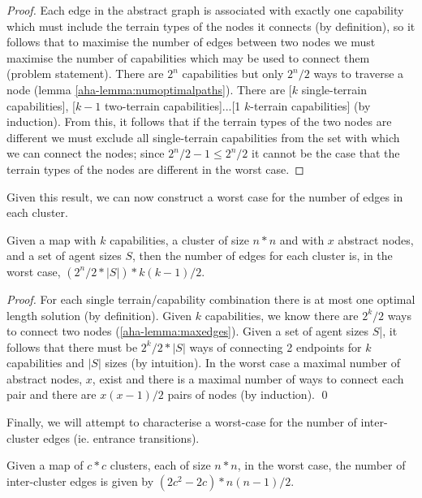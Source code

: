 \begin{proof}
Each edge in the abstract graph is associated with exactly one capability which must include the terrain types of the nodes it connects (by definition), so it follows that to maximise the number of edges between two nodes we must maximise the number of capabilities which may be used to connect them (problem statement). There are $2^n$ capabilities but only $2^n/2$ ways to traverse a node (lemma \ref{aha-lemma:numoptimalpaths}). There are [$k$ single-terrain capabilities], [$k-1$ two-terrain capabilities]...[1 $k$-terrain capabilities] (by induction). From this, it follows that if the terrain types of the two nodes are different we must exclude all single-terrain capabilities from the set with which we can connect the nodes; since $2^n/2 - 1 \le 2^n/2$ it cannot be the case that the terrain types of the nodes are different in the worst case. 
\end{proof}

Given this result, we can now construct a worst case for the number of edges in each cluster.
\begin{lemma}
\label{aha-lemma:maxedgesincluster}
Given a map with $k$ capabilities, a cluster of size $n*n$ and with $x$ abstract nodes, and a set of agent sizes $S$, then the number of edges for each cluster is, in the worst case, $(2^n/2 * |S|) * k(k-1)/2$.
\end{lemma}

\begin{proof}
For each single terrain/capability combination there is at most one optimal length solution (by definition). Given $k$ capabilities, we know there are $2^k/2$ ways to connect two nodes (\ref{aha-lemma:maxedges}). Given a set of agent sizes $S$|, it follows that there must be $2^k/2 * |S|$ ways of connecting 2 endpoints for $k$ capabilities and $|S|$ sizes (by intuition). In the worst case a maximal number of abstract nodes, $x$, exist and there is a maximal number of ways to connect each pair and there are $x(x-1)/2$ pairs of nodes (by induction). \qed
\end{proof}

Finally, we will attempt to characterise a worst-case for the number of inter-cluster edges (ie. entrance transitions). 
\begin{lemma}
\label{aha-lemma:maxtransitions}
Given a map of $c*c$ clusters, each of size $n*n$, in the worst case, the number of inter-cluster edges is given by $(2c^2 - 2c)*n(n-1)/2$.
\end{lemma}

